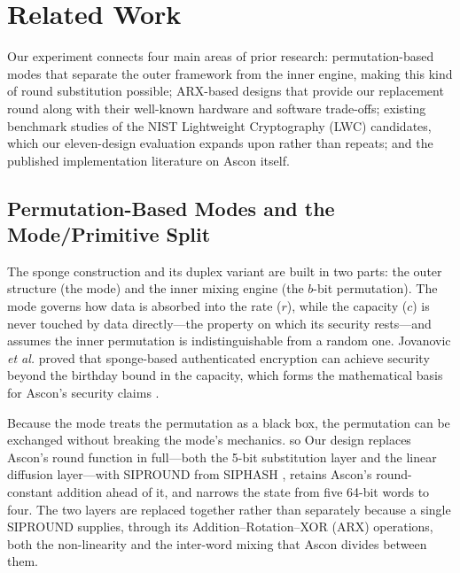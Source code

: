 %

\section{Related Work}
\label{sec:related}

Our experiment connects four main areas of prior research: permutation-based modes that separate the outer framework from the inner engine, making this kind of round substitution possible; ARX-based designs that provide our replacement round along with their well-known hardware and software trade-offs; existing benchmark studies of the NIST Lightweight Cryptography (LWC) candidates, which our eleven-design evaluation expands upon rather than repeats; and the published implementation literature on Ascon itself.

\subsection{Permutation-Based Modes and the Mode/Primitive Split}
The sponge construction \cite{sponge} and its duplex variant \cite{duplex} are built in two parts: the outer structure (the mode) and the inner mixing engine (the $b$-bit permutation). The mode governs how data is absorbed into the rate ($r$), while the capacity ($c$) is never touched by data directly---the property on which its security rests---and assumes the inner permutation is indistinguishable from a random one. Jovanovic \emph{et al.} \cite{jlm} proved that sponge-based authenticated encryption can achieve security beyond the birthday bound in the capacity, which forms the mathematical basis for Ascon's security claims \cite{caesar}.

Because the mode treats the permutation as a black box, the permutation can be exchanged without breaking the mode's mechanics. 
so Our design replaces Ascon's round function in full---both the 5-bit substitution layer and the linear diffusion layer---with SIPROUND from SIPHASH \cite{siphash}, retains Ascon's round-constant addition ahead of it, and narrows the state from five 64-bit words to four. The two layers are replaced together rather than separately because a single SIPROUND supplies, through its Addition--Rotation--XOR (ARX) operations, both the non-linearity and the inter-word mixing that Ascon divides between them.


